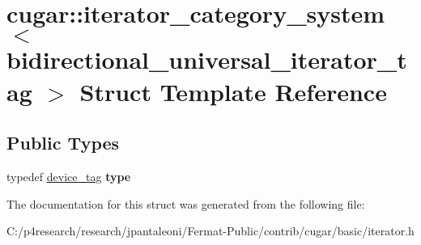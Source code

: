\hypertarget{structcugar_1_1iterator__category__system_3_01bidirectional__universal__iterator__tag_01_4}{}\section{cugar\+:\+:iterator\+\_\+category\+\_\+system$<$ bidirectional\+\_\+universal\+\_\+iterator\+\_\+tag $>$ Struct Template Reference}
\label{structcugar_1_1iterator__category__system_3_01bidirectional__universal__iterator__tag_01_4}
\subsection*{Public Types}
\begin{DoxyCompactItemize}
\item 
\mbox{\label{structcugar_1_1iterator__category__system_3_01bidirectional__universal__iterator__tag_01_4_a61cca09e6fe4b5d85ebfee21db2955c6}} 
typedef \hyperlink{structcugar_1_1device__tag}{device\+\_\+tag} {\bfseries type}
\end{DoxyCompactItemize}


The documentation for this struct was generated from the following file\+:\begin{DoxyCompactItemize}
\item 
C\+:/p4research/research/jpantaleoni/\+Fermat-\/\+Public/contrib/cugar/basic/iterator.\+h\end{DoxyCompactItemize}

